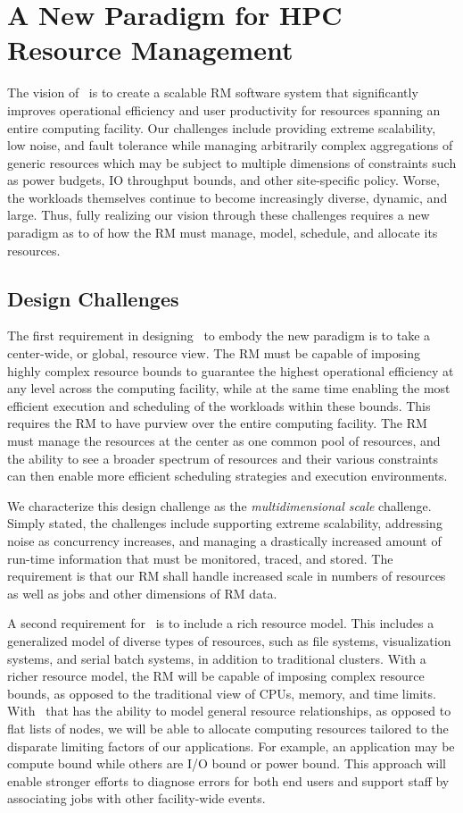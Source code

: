 \section{A New Paradigm for HPC Resource Management}
The vision of \flux\ is to create a scalable RM
software system that significantly improves
operational efficiency and user productivity
for resources spanning an entire
computing facility.
Our challenges include providing extreme
scalability, low noise, and fault tolerance while
managing arbitrarily complex aggregations of generic resources
which may be subject to multiple dimensions of constraints
such as power budgets, IO throughput bounds, and other site-specific
policy.
Worse, the workloads themselves continue to become
increasingly diverse, dynamic, and large.
Thus, fully realizing our vision through
these challenges requires a new paradigm as to 
of how the RM must manage, model, schedule,
and allocate its resources.

\subsection{Design Challenges}
\label{sect:challenges}

The first requirement in designing \flux\ to 
embody the new paradigm is to take a center-wide, or global,
resource view.  The RM must be capable of
imposing highly complex resource bounds
to guarantee the highest operational efficiency
at any level across the computing facility, 
while at the same time enabling the most efficient
execution and scheduling of the workloads
within these bounds.
This requires the RM to have purview over 
the entire computing facility. 
The RM must manage the resources at the center
as one common pool of resources, and the ability
to see a broader spectrum of resources
and their various constraints can then enable
more efficient scheduling strategies
and execution environments. 

We characterize this design challenge as the {\em multidimensional
scale} challenge.  Simply stated, the challenges include
supporting extreme scalability, addressing noise as concurrency
increases, and managing a drastically increased amount of
run-time information that must be monitored, traced, and stored.
The requirement is that our RM shall handle increased scale in
numbers of resources as well as jobs and other dimensions of RM data.

A second requirement for \flux\ is to include a rich resource model.
This includes a generalized model of diverse types of resources,
such as file systems, visualization systems, and serial batch systems,
in addition to traditional clusters.   With a richer resource model,
the RM will be capable of imposing complex resource bounds,
as opposed to the traditional view of CPUs, memory, and time limits.
With \flux\ that has the ability to model general resource
relationships, as opposed to flat lists of nodes, we will be able
to allocate computing resources tailored to the disparate limiting
factors of our applications.  For example, an application may be
compute bound while others are I/O bound or power bound.
This approach will enable stronger efforts to diagnose errors
for both end users and support staff by associating jobs
with other facility-wide events.

